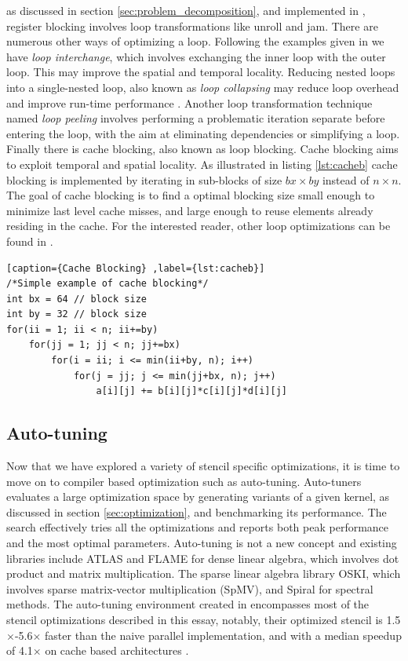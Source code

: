 as discussed in section \ref{sec:problem_decomposition}, and implemented in \cite{article1}, register blocking involves loop transformations like unroll and jam. There are numerous other ways of optimizing a loop. Following the examples given in \cite{article10} we have \textit{loop interchange}, which involves exchanging the inner loop with the outer loop. This may improve the spatial and temporal locality. Reducing nested loops into a single-nested loop, also known as \textit{loop collapsing} may reduce loop overhead and improve run-time performance \cite{article11}. Another loop transformation technique named \textit{loop peeling} involves performing a problematic iteration separate before entering the loop, with the aim at eliminating dependencies or simplifying a loop. Finally there is cache blocking, also known as loop blocking. Cache blocking  aims to exploit temporal and spatial locality. As illustrated in listing \ref{lst:cacheb} cache blocking is implemented by iterating in sub-blocks of size \(bx \times by\) instead of \(n \times n\). The goal of cache blocking is to find a optimal blocking size small enough to minimize last level cache misses, and large enough to reuse elements already residing in the cache. For the interested reader, other loop optimizations can be found in \cite{article12}.

\begin{lstlisting}[caption={Cache Blocking} ,label={lst:cacheb}]
/*Simple example of cache blocking*/
int bx = 64 // block size
int by = 32 // block size
for(ii = 1; ii < n; ii+=by)
 	for(jj = 1; jj < n; jj+=bx)
     	for(i = ii; i <= min(ii+by, n); i++)
         	for(j = jj; j <= min(jj+bx, n); j++)
         		a[i][j] += b[i][j]*c[i][j]*d[i][j]
\end{lstlisting}

\subsection{Auto-tuning}
Now that we have explored a variety of stencil specific optimizations, it is time to move on to compiler based optimization such as auto-tuning. Auto-tuners evaluates a large optimization space by generating variants of a given kernel, as discussed in section \ref{sec:optimization}, and benchmarking its performance. The search effectively tries all the optimizations and reports both peak performance and the most optimal parameters. Auto-tuning is not a new concept and existing libraries include ATLAS and FLAME for dense linear algebra, which involves dot product and matrix multiplication. The sparse linear algebra library OSKI, which involves sparse matrix-vector multiplication (SpMV), and Spiral for spectral methods. The auto-tuning environment created in \cite{article1} encompasses most of the stencil optimizations described in this essay, notably, their optimized stencil is 1.5\(\times\)-5.6\(\times\) faster than the naive parallel implementation, and with a median speedup of 4.1\(\times\)  on cache based architectures \cite{article1}.

